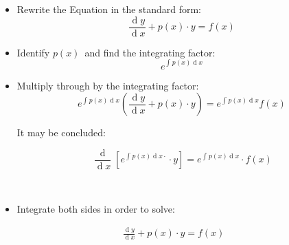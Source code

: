 \documentclass[18pt]{report}
\def\lthtmlcheckvsize{\ifdim\ht\sizebox<\vsize 
  \ifdim\wd\sizebox<\hsize\expandafter\hfill\fi \expandafter\vfill
  \else\expandafter\vss\fi}%
\begin{document}
{\newpage\clearpage
{}%
\begin{tcolorbox}
\par
\begin{itemize}
    \item Rewrite the Equation in the standard form:
      \begin{displaymath}
      \frac{\operatorname{d}y }{\operatorname{d} x}+ p\left( x \right)\cdot y = f \left( x \right)  
      \end{displaymath}
    \item Identify $p\left( x \right)$\  and find the integrating factor: 
      \begin{displaymath}
      e^{\int^{}_{} p\left( x \right)  \operatorname{d}x }
      \end{displaymath} 
      \item Multiply through by the integrating factor:
        \begin{displaymath}
    e^{\int^{}_{} p\left( x \right)  \operatorname{d}x } \left(  \frac{\operatorname{d}y }{\operatorname{d} x}+ p\left( x \right)\cdot y \right) = e^{\int^{}_{} p\left( x \right)  \operatorname{d}x }f \left( x \right)  
        \end{displaymath}
\par
\subitem It may be concluded:
        \ \
\par
\hfill\begin{minipage}{\dimexpr\textwidth-3cm}
        \begin{displaymath}
        \frac{\operatorname{d} }{\operatorname{d} x}\left[ e^{\int^{}_{} p\left( x \right)  \operatorname{d}x \cdot  } \cdot y\right] = e^{\int^{}_{} p\left( x \right)  \operatorname{d}x } \cdot f \left( x \right) 
        \end{displaymath}
        \end{minipage}
        \ \
\par
\item Integrate both sides in order to solve:
  \end{itemize}
\par
\end{tcolorbox}%
\lthtmlfigureZ
\lthtmlcheckvsize\clearpage}

{\newpage\clearpage
{}%
\begin{align}
\frac{\operatorname{d}y }{\operatorname{d} x} +  p\left( x \right)\cdot  y= f\left( x \right)
\end{align}%
\lthtmlfigureZ
\lthtmlcheckvsize\clearpage}
\end{document}
